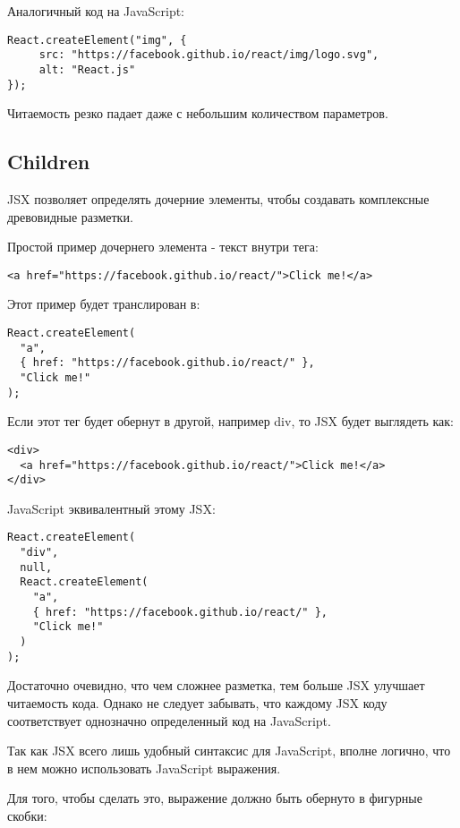 Аналогичный код на JavaScript:

\begin{lstlisting}
React.createElement("img", {
     src: "https://facebook.github.io/react/img/logo.svg",
     alt: "React.js"
});
\end{lstlisting}

Читаемость резко падает даже с небольшим количеством параметров.

\subsection{Children}

JSX позволяет определять дочерние элементы, чтобы создавать комплексные древовидные разметки.

Простой пример дочернего элемента - текст внутри тега:

\begin{lstlisting}
<a href="https://facebook.github.io/react/">Click me!</a>
\end{lstlisting}

Этот пример будет транслирован в:

\begin{lstlisting}
React.createElement(
  "a",
  { href: "https://facebook.github.io/react/" },
  "Click me!"
);
\end{lstlisting}
   
Если этот тег будет обернут в другой, например div, то JSX будет выглядеть как:

\begin{lstlisting}
<div>
  <a href="https://facebook.github.io/react/">Click me!</a>
</div>
\end{lstlisting}

JavaScript эквивалентный этому JSX:

\begin{lstlisting}
React.createElement(
  "div",
  null,
  React.createElement(
    "a",
    { href: "https://facebook.github.io/react/" },
    "Click me!"
  ) 
);
\end{lstlisting}

Достаточно очевидно, что чем сложнее разметка, тем больше JSX улучшает читаемость кода. Однако не следует забывать, что каждому JSX коду соответствует однозначно определенный код на JavaScript.

Так как JSX всего лишь удобный синтаксис для JavaScript, вполне логично, что в нем можно использовать JavaScript выражения. 

Для того, чтобы сделать это, выражение должно быть обернуто в фигурные скобки:

